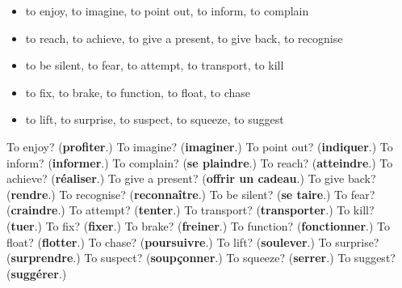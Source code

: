 \begin{itemize}
\raggedright
  \item to enjoy, to imagine, to point out, to inform, to complain
  \item to reach, to achieve, to give a present, to give back, to recognise
  \item to be silent, to fear, to attempt, to transport, to kill
  \item to fix, to brake, to function, to float, to chase
  \item to lift, to surprise, to suspect, to squeeze, to suggest
\end{itemize}

\begin{tcolorbox}[breakable,colback=teal!4,colframe=teal!35!black,title={Before you move on}]
To enjoy? (\textbf{profiter}.) To imagine? (\textbf{imaginer}.) To point out? (\textbf{indiquer}.) To inform? (\textbf{informer}.) To complain? (\textbf{se plaindre}.) To reach? (\textbf{atteindre}.) To achieve? (\textbf{réaliser}.) To give a present? (\textbf{offrir un cadeau}.) To give back? (\textbf{rendre}.) To recognise? (\textbf{reconnaître}.) To be silent? (\textbf{se taire}.) To fear? (\textbf{craindre}.) To attempt? (\textbf{tenter}.) To transport? (\textbf{transporter}.) To kill? (\textbf{tuer}.) To fix? (\textbf{fixer}.) To brake? (\textbf{freiner}.) To function? (\textbf{fonctionner}.) To float? (\textbf{flotter}.) To chase? (\textbf{poursuivre}.) To lift? (\textbf{soulever}.) To surprise? (\textbf{surprendre}.) To suspect? (\textbf{soupçonner}.) To squeeze? (\textbf{serrer}.) To suggest? (\textbf{suggérer}.)
\end{tcolorbox}
